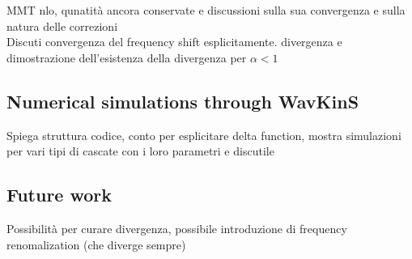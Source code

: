     MMT nlo, qunatità ancora conservate e discussioni sulla sua convergenza e sulla natura delle correzioni\\
    Discuti convergenza del frequency shift esplicitamente.
    divergenza e dimostrazione dell'esistenza della divergenza per $\alpha < 1$\\
    \subsection{Numerical simulations through WavKinS}

    Spiega struttura codice, conto per esplicitare delta function, mostra simulazioni per vari tipi di cascate con i loro parametri e discutile
    \subsection{Future work}
    
    Possibilità per curare divergenza, possibile introduzione di frequency renomalization (che diverge sempre)


